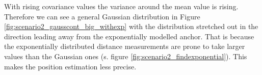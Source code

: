 \documentclass{article}
\begin{document}
\begin{itemize}
		\begin{figure}[hbt!]
        \begin{floatrow}
		\end{floatrow}
		\end{figure}
		
		With rising covariance values the variance around the mean value is rising. Therefore we can see a general Gaussian distribution in Figure \ref{fig:scenario2_gausscont_big_withexp} with the distribution stretched out in the direction leading away from the exponentially modelled anchor. That is because the exponentially distributed distance measurements are prone to take larger values than the Gaussian ones (s. figure \ref{fig:scenario2_findexponential}). This makes the position estimation less precise.
		
		\newpage
		
		\begin{figure}[hbt!]
        \begin{floatrow}
		\end{floatrow}
		\end{figure}
		

\end{itemize}
\end{document}
